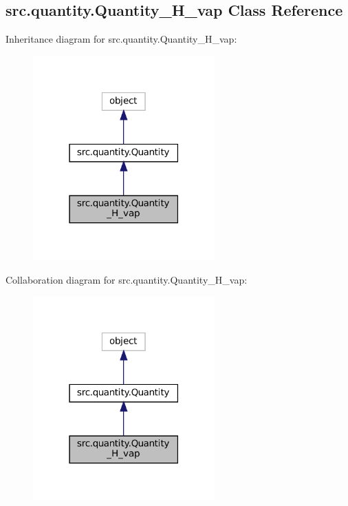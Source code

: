 \hypertarget{classsrc_1_1quantity_1_1Quantity__H__vap}{}\subsection{src.\+quantity.\+Quantity\+\_\+\+H\+\_\+vap Class Reference}
\label{classsrc_1_1quantity_1_1Quantity__H__vap}


Inheritance diagram for src.\+quantity.\+Quantity\+\_\+\+H\+\_\+vap\+:
\nopagebreak
\begin{figure}[H]
\begin{center}
\leavevmode
\includegraphics[width=198pt]{classsrc_1_1quantity_1_1Quantity__H__vap__inherit__graph}
\end{center}
\end{figure}


Collaboration diagram for src.\+quantity.\+Quantity\+\_\+\+H\+\_\+vap\+:
\nopagebreak
\begin{figure}[H]
\begin{center}
\leavevmode
\includegraphics[width=198pt]{classsrc_1_1quantity_1_1Quantity__H__vap__coll__graph}
\end{center}
\end{figure}
